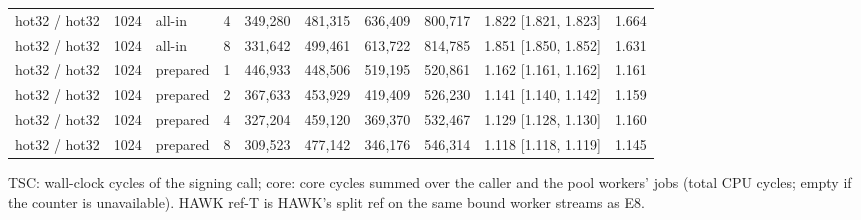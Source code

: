 \begin{table}[t]
{\begin{tabular}{lrlrrrrrlr}
hot32 / hot32 & 1024 & all-in & 4 & 349{,}280 & 481{,}315 & 636{,}409 & 800{,}717 & 1.822 [1.821, 1.823] & 1.664 \\
hot32 / hot32 & 1024 & all-in & 8 & 331{,}642 & 499{,}461 & 613{,}722 & 814{,}785 & 1.851 [1.850, 1.852] & 1.631 \\
hot32 / hot32 & 1024 & prepared & 1 & 446{,}933 & 448{,}506 & 519{,}195 & 520{,}861 & 1.162 [1.161, 1.162] & 1.161 \\
hot32 / hot32 & 1024 & prepared & 2 & 367{,}633 & 453{,}929 & 419{,}409 & 526{,}230 & 1.141 [1.140, 1.142] & 1.159 \\
hot32 / hot32 & 1024 & prepared & 4 & 327{,}204 & 459{,}120 & 369{,}370 & 532{,}467 & 1.129 [1.128, 1.130] & 1.160 \\
hot32 / hot32 & 1024 & prepared & 8 & 309{,}523 & 477{,}142 & 346{,}176 & 546{,}314 & 1.118 [1.118, 1.119] & 1.145 \\
\bottomrule
\end{tabular}}
\par\smallskip\parbox{\linewidth}{\scriptsize TSC: wall-clock cycles of the signing call; core: core cycles summed over the caller and the pool workers' jobs (total CPU cycles; empty if the counter is unavailable). HAWK ref-T is HAWK's split ref on the same bound worker streams as E8.}
\end{table}

